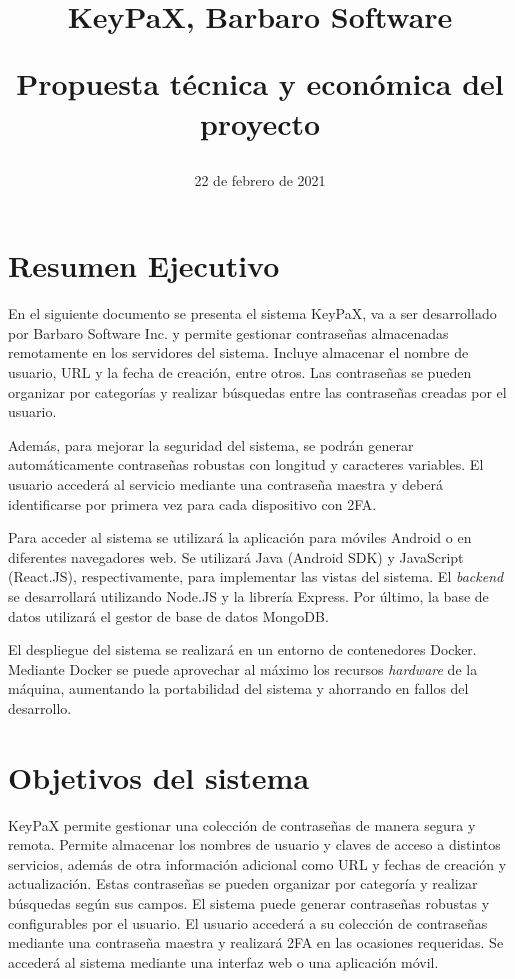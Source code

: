 \documentclass{article}
\title{
\Huge{KeyPaX, Barbaro Software} \\ 
\begin{Large} 
Propuesta técnica y económica del proyecto
\end{Large}}
\author{}
\date{22 de febrero de 2021}
\begin{document}
\maketitle

\pagebreak

\section{Resumen Ejecutivo}

En el siguiente documento se presenta el sistema KeyPaX, va a ser desarrollado por Barbaro Software Inc. y permite gestionar contraseñas almacenadas remotamente en los servidores del sistema. Incluye almacenar el nombre de usuario, URL y la fecha de creación, entre otros. Las contraseñas se pueden organizar por categorías y realizar búsquedas entre las contraseñas creadas por el usuario.

Además, para mejorar la seguridad del sistema, se podrán generar automáticamente contraseñas robustas con longitud y caracteres variables. El usuario accederá al servicio mediante una contraseña maestra y deberá identificarse por primera vez para cada dispositivo con 2FA.

Para acceder al sistema se utilizará la aplicación para móviles Android o en diferentes navegadores web. Se utilizará Java (Android SDK) y JavaScript (React.JS), respectivamente, para implementar las vistas del sistema. El \textit{backend} se desarrollará utilizando Node.JS y la librería Express. Por último, la base de datos utilizará el gestor de base de datos MongoDB. 

El despliegue del sistema se realizará en un entorno de contenedores Docker. Mediante Docker se puede aprovechar al máximo los recursos \textit{hardware} de la máquina, aumentando la portabilidad del sistema y ahorrando en fallos del desarrollo. 




\pagebreak

\tableofcontents

\pagebreak

\section{Objetivos del sistema}


KeyPaX permite gestionar una colección de contraseñas de manera segura y remota. Permite almacenar los nombres de usuario y claves de acceso a distintos servicios, además de otra información adicional como URL y fechas de creación y actualización. Estas contraseñas se pueden organizar por categoría y realizar búsquedas según sus campos. El sistema puede generar contraseñas robustas y configurables por el usuario. El usuario accederá a su colección de contraseñas mediante una contraseña maestra y realizará 2FA en las ocasiones requeridas. Se accederá al sistema mediante una interfaz web o una aplicación móvil.
\end{document}
